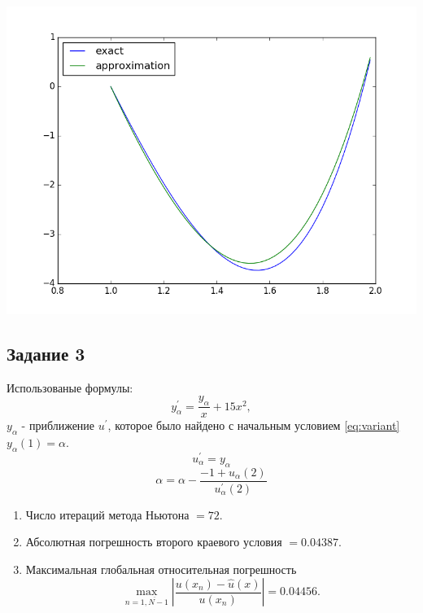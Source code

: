 \documentclass[oneside, final, 12pt]{article}
\begin{document}
\begin{enumerate}
    \includegraphics[scale=0.5]{plot2.png}
\end{enumerate}



\subsection{Задание 3}
Использованые формулы:
\begin{equation*}
    y^{'}_{\alpha} = \dfrac{y_{\alpha}}{x} + 15 x^2,
\end{equation*}
$y_{\alpha}$ - приближение $u^{'}$, которое было найдено с начальным условием \eqref{eq:variant} $y_{\alpha}(1) = \alpha$.
\begin{equation*}
    u^{'}_{\alpha} = y_{\alpha}
\end{equation*}
\begin{equation*}
    \alpha = \alpha - \dfrac{-1 + u_\alpha(2)}{u^{'}_\alpha(2)}
\end{equation*}

\begin{enumerate}
    \item Число итераций метода Ньютона $= 72$.
    \item Абсолютная погрешность второго краевого условия $= 0.04387$.
    \item Максимальная глобальная относительная погрешность
    \begin{equation*}
        \max\limits_{n = \overline{1, N-1}} \left| \dfrac{u(x_n) - \hat{u}(x)}{u(x_n)} \right| = 0.04456.
    \end{equation*}
\end{enumerate}


\end{document}
